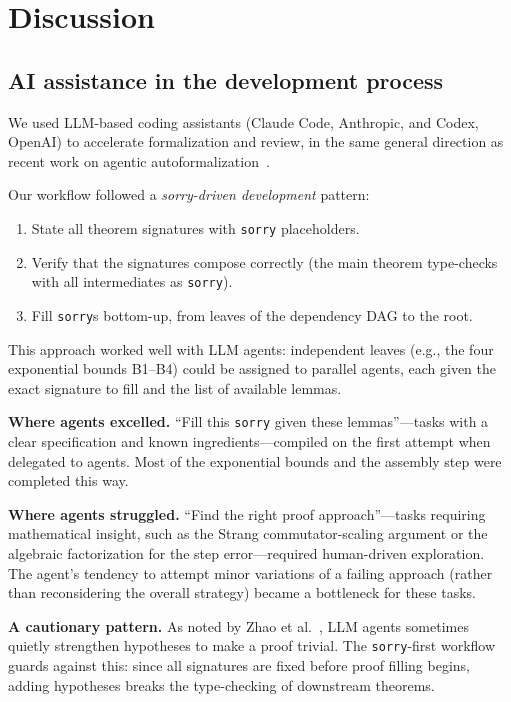 \section{Discussion}
\label{sec:discussion}

\subsection{AI assistance in the development process}
\label{sec:ai}

We used LLM-based coding assistants (Claude Code, Anthropic, and Codex,
OpenAI) to accelerate formalization and review, in the same general direction
as recent work on agentic autoformalization~\cite{ren2026merlean}.

Our workflow followed a \emph{sorry-driven development} pattern:
\begin{enumerate}
  \item State all theorem signatures with \texttt{sorry} placeholders.
  \item Verify that the signatures compose correctly (the main theorem
    type-checks with all intermediates as \texttt{sorry}).
  \item Fill \texttt{sorry}s bottom-up, from leaves of the dependency DAG
    to the root.
\end{enumerate}
This approach worked well with LLM agents: independent leaves
(e.g., the four exponential bounds B1--B4) could be assigned to parallel
agents, each given the exact signature to fill and the list of available
lemmas.

\textbf{Where agents excelled.} ``Fill this \texttt{sorry} given these
lemmas''---tasks with a clear specification and known
ingredients---compiled on the first attempt when delegated to agents.
Most of the exponential bounds and the assembly step were completed this way.

\textbf{Where agents struggled.} ``Find the right proof approach''---tasks
requiring mathematical insight, such as the Strang commutator-scaling argument
or the algebraic factorization for the step error---required human-driven
exploration. The agent's tendency to attempt minor variations of a failing
approach (rather than reconsidering the overall strategy) became a bottleneck
for these tasks.

\textbf{A cautionary pattern.} As noted by Zhao et al.~\cite{zhao2025chsh},
LLM agents sometimes quietly strengthen hypotheses to make a proof trivial.
The \texttt{sorry}-first workflow guards against this: since all signatures are
fixed before proof filling begins, adding hypotheses breaks the type-checking
of downstream theorems.

